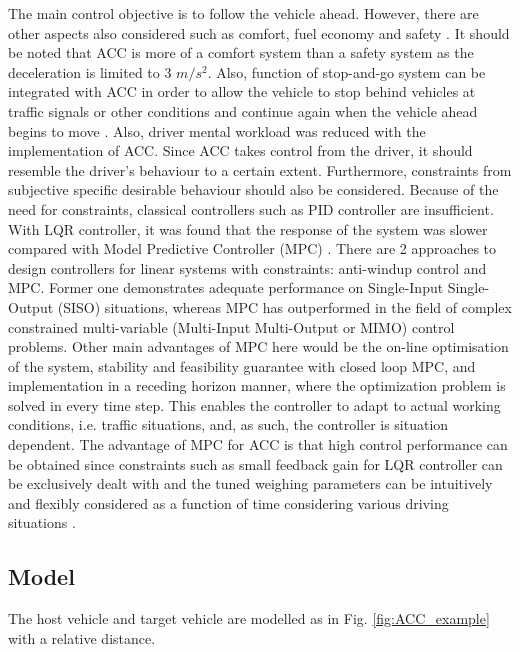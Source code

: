 The main control objective is to follow the vehicle ahead. However, there are other aspects also considered such as comfort, fuel economy and safety \cite{Elsevier}. It should be noted that ACC is more of a comfort system than a safety system as the deceleration is limited to 3 $m/s^2$. Also, function of stop-and-go system can be integrated with ACC in order to allow the vehicle to stop behind vehicles at traffic signals or other conditions and continue again when the vehicle ahead begins to move \cite{ACC_SG}.  Also, driver mental workload was reduced with the implementation of ACC. Since ACC takes control from the driver, it should resemble the driver’s behaviour to a certain extent. Furthermore, constraints from subjective specific desirable behaviour should also be considered. Because of the need for constraints, classical controllers such as PID controller are insufficient. With LQR controller, it was found that the response of the system was slower compared with Model Predictive Controller (MPC) \cite{Takahama}. There are 2 approaches to design controllers for linear systems with constraints: anti-windup control and MPC. Former one demonstrates adequate performance on Single-Input Single-Output (SISO) situations, whereas MPC has outperformed in the field of complex constrained multi-variable (Multi-Input Multi-Output or MIMO) control problems. Other main advantages of MPC here would be the on-line optimisation of the system, stability and feasibility guarantee with closed loop MPC, and implementation in a receding horizon manner, where the optimization problem is solved in every time step. This enables the controller to adapt to actual working conditions, i.e. traffic situations, and, as such, the controller is situation dependent. The advantage of MPC for ACC is that high control performance can be obtained since constraints such as small feedback gain for LQR controller can be exclusively dealt with and the tuned weighing parameters can be intuitively and flexibly considered as a function of time considering various driving situations \cite{Takahama}.


\subsection{Model}

The host vehicle and target vehicle are modelled as in Fig. \ref{fig:ACC_example} with a relative distance.

